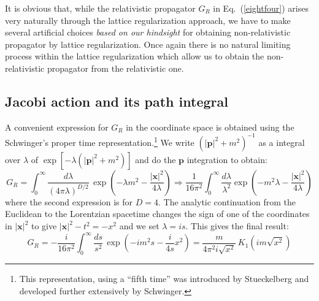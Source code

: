\documentclass[12pt]{article}
\def\eq#1{{Eq.~(\ref{#1})}}
\begin{document}
It is obvious that, while the relativistic propagator $G_R$ in \eq{eightfour} arises very naturally through the lattice regularization approach, we have to  make several artificial choices \textit{based on our hindsight} for obtaining non-relativistic propagator by lattice regularization. Once again there is no natural limiting process within the lattice regularization which allow us to obtain the non-relativistic propagator from the relativistic one. 

\subsection{Jacobi action and its path integral}\label{sec:jacobi}

A convenient expression for $G_R$ in the coordinate space is obtained using the Schwinger's proper time representation.\footnote{This representation, using a ``fifth time'' was introduced by Stueckelberg \cite{E1,E2} and developed further extensively by Schwinger.} 
 We write $(|{\bm p}|^2+m^2)^{-1}$ as a integral over $\lambda$ of $\exp[-\lambda(|{\bm p}|^2+m^2)]$ and do the $\bm{p}$ integration to obtain:
\begin{equation}
G_R = \int_0^\infty \frac{d\lambda}{(4\pi\lambda)^{D/2}}\, \exp\left({-\lambda m^2-\frac{|\mathbf{x}|^2}{4\lambda}}\right)
\Rightarrow\frac{1}{16\pi^2} \int_0^\infty\frac{d\lambda}{\lambda^2} \exp \left({-m^2\lambda-\frac{|\mathbf{x}|^2}{4\lambda}}\right)
\end{equation}
where the second expression is for 
$D=4$.
The analytic continuation from the Euclidean to the Lorentzian spacetime changes the sign of one of the coordinates in $|{\mathbf x}|^2$ to give $|{\bm x}|^2-t^2=-x^2$ and we set $\lambda = i s$. This gives the final result:
\begin{equation}
G_R 
=-\frac{i}{16\pi^2}\int_0^\infty\frac{ds}{s^2}\, \exp\left({-im^2 s- \frac{i}{4s}x^2}\right)=\frac{m}{4\pi^2 i \sqrt{x^2}} \, K_1(im\sqrt{x^2})
\label{macd}
\end{equation} 
\end{document}
